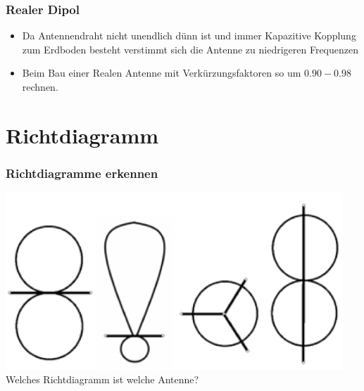 \begin{frame}
    \frametitle{Realer Dipol}
        \begin{center}
    	\begin{itemize}
		\item Da Antennendraht nicht unendlich dünn ist und immer Kapazitive Kopplung zum Erdboden besteht verstimmt sich die Antenne zu niedrigeren Frequenzen
		\item Beim Bau einer Realen Antenne mit Verkürzungsfaktoren so um $0.90-0.98$ rechnen.
    	\end{itemize}
	\end{center}
\end{frame}

\section*{Richtdiagramm}

\begin{frame}
    \frametitle{Richtdiagramme erkennen}
    \begin{center}
        \includegraphics[width=0.95\textwidth]{a09/Abstrahl.png}
        \tiny \hyperlink{refs}{\cite{bna}} \\[1em] \large Welches Richtdiagramm ist welche Antenne?
    \end{center}
\end{frame}

